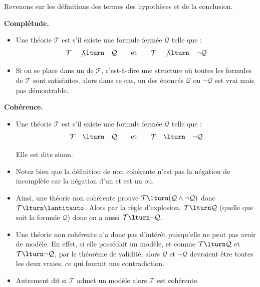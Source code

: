 \documentclass[11pt,class=report,crop=false]{standalone}
\begin{document}
Revenons sur les définitions des termes des hypothèses et de la conclusion.

\textbf{Complétude.}
\begin{itemize}
    \item Une théorie $\mathcal{T}$ est  s'il existe une formule fermée $\mathcal{Q}$ telle que :
\[
\mathcal{T} \quad \not\lturn \quad \mathcal{Q} \qquad \text{et} \qquad \mathcal{T} \quad \not\lturn \quad \lnot \mathcal{Q}
\]

    \item Si on se place dans un  de $\mathcal{T}$, c'est-à-dire une structure où toutes les formules de $\mathcal{T}$ sont satisfaites, alors dans ce cas, un des énoncés $\mathcal{Q}$ ou $\lnot\mathcal{Q}$ est vrai mais pas démontrable.
\end{itemize}


\bigskip

\textbf{Cohérence.}

\begin{itemize}
    \item Une théorie $\mathcal{T}$ est  s'il existe une formule fermée $\mathcal{Q}$ telle que :
\[
\mathcal{T} \quad \lturn\quad \mathcal{Q} \qquad \text{et} \qquad \mathcal{T} \quad \lturn \quad \lnot\mathcal{Q}
\]

Elle est dite  sinon.

    \item Notez bien que la définition de \og{}non cohérente\fg{} n'est pas la négation de \og{}incomplète\fg{} car la négation d'un \og{}et\fg{} est un \og{}ou\fg{}.

    \item Ainsi, une théorie non cohérente prouve $\mathcal{T} \lturn (\mathcal{Q} \land \lnot\mathcal{Q})$ donc $\mathcal{T} \lturn \lantitauto$.
    Alors par la règle d'explosion, $\mathcal{T} \lturn \mathcal{Q}$ (quelle que soit la formule $\mathcal{Q}$) donc on a aussi $\mathcal{T} \lturn \lnot\mathcal{Q}$.

    \item Une théorie non cohérente n'a donc pas d'intérêt puisqu'elle ne peut pas avoir de modèle. En effet, si elle possédait un modèle, et comme $\mathcal{T} \lturn \mathcal{Q}$ et $\mathcal{T} \lturn \lnot\mathcal{Q}$, par le théorème de validité, alors $\mathcal{Q}$ et $\lnot\mathcal{Q}$ devraient être toutes les deux vraies, ce qui fournit une contradiction.

    \item Autrement dit si $\mathcal{T}$ admet un modèle alors $\mathcal{T}$ est cohérente.
\end{itemize}
\end{document}

